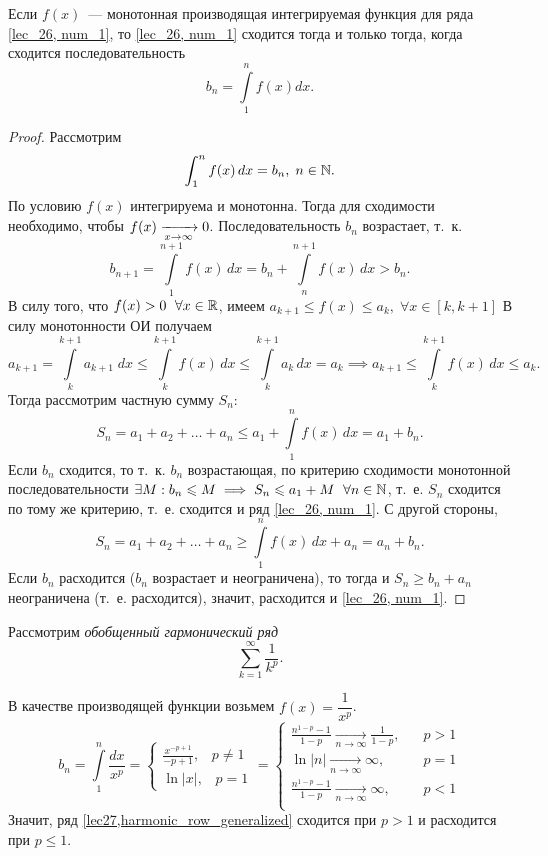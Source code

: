 \documentclass[../../main.tex]{subfiles}
\begin{document}
	\begin{thm} \label{lec27,integral_att}
		Если $f(x)$~--- монотонная производящая интегрируемая функция для ряда 
		\eqref{lec_26, num_1}, то \eqref{lec_26, num_1} сходится тогда и только 
		тогда, когда сходится последовательность \[b_n = \int\limits_1^n f(x)dx.\]
		\begin{proof}
			Рассмотрим
			\[ \int_{1}^{n} f(x) \, dx = b_n , \; n \in \mathbb{N}.  \]
			По условию $f(x)$ интегрируема и монотонна. Тогда для сходимости 
			необходимо, чтобы $f(x) \xrightarrow[x\to\infty]{}0$.
			Последовательность $b_n$ возрастает, т.~к.
			\[ b_{n+1} = \int\limits_{1}^{n+1} f(x) \, dx  = b_n + 
			\int\limits_{n}^{n+1} f(x) \, dx > 
			b_n. \]
			В силу того, что $f(x) > 0 \ \; \forall x \in \mathbb{R}$,
			имеем $a_{k+1} \le f(x) \le a_k, \; \forall x \in [k,k+1]$
			В силу монотонности ОИ получаем
			\[ a_{k+1} = \int\limits_{k}^{k+1}a_{k+1} \; dx  \le 
			\int\limits_{k}^{k+1}f(x) \, dx \le 
			\int\limits_{k}^{k+1}a_{k} \, dx  = a_{k} \implies a_{k+1} \le 
			\int\limits_{k}^{k+1}f(x) \, dx \le a_k. \]
			Тогда рассмотрим частную сумму $S_n$:
			\[ S_n = a_1 + a_2 + \dots + a_n \le a_1 +  \int\limits_{1}^{n}f(x) \, dx  
			= a_1 + 
			b_n. \]
			Если $b_n$ сходится, то т.~к. $b_n$ возрастающая, по критерию сходимости 
			монотонной последовательности $\exists M : b_n \leqslant M \implies S_n \leqslant a_1 + 
			M \ \; 
			\forall n \in \mathbb{N}$, т.~е. $S_n$ сходится по тому же критерию, т.~е. сходится 
			и ряд \eqref{lec_26, num_1}. С другой стороны,
			\[ S_n = a_1 + a_2 + \dots + a_n \ge \int\limits_{1}^{n}f(x) \, dx  + a_n = 
			a_n + b_n. \]
			Если $b_n$ расходится ($b_n$ возрастает и неограничена), то тогда и $S_n 
			\ge 
			b_n + a_n$ неограничена (т.~е. расходится), значит, расходится и 
			\eqref{lec_26, num_1}.
		\end{proof}
	\end{thm}

	\begin{iex} Рассмотрим \emph{обобщенный гармонический ряд}
		\begin{equation}  \sum_{k = 1}^{\infty} \frac{1}{k^p}. 
		\label{lec27,harmonic_row_generalized}  \end{equation}
		
		В качестве производящей функции возьмем $f(x) = \dfrac{1}{x^p}$.
		\[ b_n = \int\limits_{1}^{n} \frac{dx}{x^p} = \begin{cases} \frac{x^{-p + 
		1}}{-p + 
		1} , \; \;\; p \ne 1  \\  \ln{|x|}, \; \; \; p = 1 \end{cases} =  
		\begin{cases} \frac{n^{1-p} - 1}{1-p } \underset{n \rightarrow \infty}
		{\longrightarrow} \frac{1}{1-p} ,& \; \;\; p > 1  \\  \ln{|n|} \underset{n 
		\rightarrow \infty}
		{\longrightarrow} \infty ,& \; \; \; p = 1 \\
		\frac{n^{1-p} - 1}{1-p } \underset{n \rightarrow \infty}
		{\longrightarrow} \infty ,& \; \;\; p < 1  \\
		\end{cases} \]
		Значит, ряд \eqref{lec27,harmonic_row_generalized} 
		сходится при $p>1$ и расходится при $p \le 1$.
		\end{iex}
		
\end{document}
